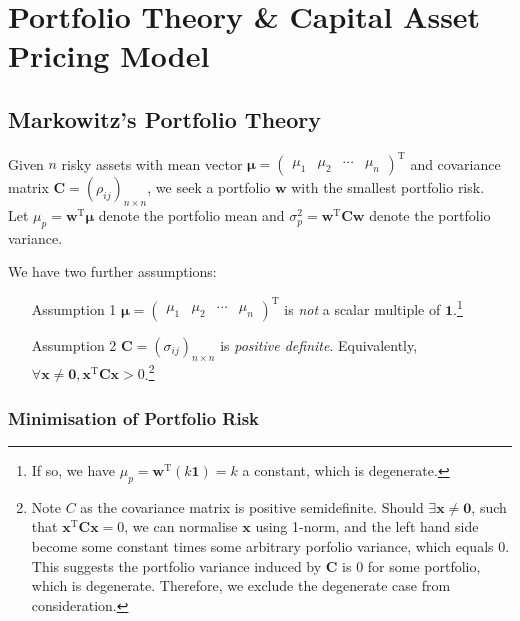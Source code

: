 \documentclass[12pt]{article}
\theoremstyle{definition}
\begin{document}
\section{Portfolio Theory \& Capital Asset Pricing Model}
\subsection{Markowitz's Portfolio Theory}
Given $n$ risky assets with mean vector $\mathbf{\mu}=\begin{pmatrix}\mu_1&\mu_2&\cdots&\mu_n\end{pmatrix}^\text{T}$ and covariance matrix $\mathbf{C}=(\rho_{ij})_{n\times n}$, we seek a portfolio $\mathbf{w}$ with the smallest portfolio risk.\\Let $\mu_p =\mathbf{w}^\text{T}\mathbf{\mu}$ denote the portfolio mean and $\sigma_p^2 = \mathbf{w}^\text{T}\mathbf{Cw}$ denote the portfolio variance.

We have two further assumptions:
\begin{enumerate}
\item[Assumption 1] $\mathbf{\mu} = \begin{pmatrix}\mu_1&\mu_2&\cdots&\mu_n\end{pmatrix}^\text{T}$ is \textit{not} a scalar multiple of $\mathbf{1}$.\footnote{If so, we have $\mu_p = \mathbf{w}^\text{T}(k\mathbf{1})=k$ a constant, which is degenerate.}
\item[Assumption 2] $\mathbf{C} = (\sigma_{ij})_{n\times n}$ is \textit{positive definite}. Equivalently, $\forall \mathbf{x}\neq \mathbf{0}, \mathbf{x}^\text{T}\mathbf{Cx}>0$.\footnote{Note $C$ as the covariance matrix is positive semidefinite. Should $\exists \mathbf{x}\neq \mathbf{0}$, such that $\mathbf{x}^\text{T}\mathbf{Cx}=0$, we can normalise $\mathbf{x}$ using 1-norm, and the left hand side become some constant times some arbitrary porfolio variance, which equals 0. This suggests the portfolio variance induced by $\mathbf{C}$ is 0 for some portfolio, which is degenerate. Therefore, we exclude the degenerate case from consideration.}
\end{enumerate}
\subsubsection{Minimisation of Portfolio Risk}
\end{document}
